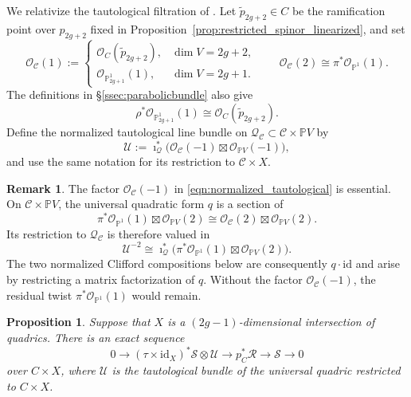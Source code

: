 \documentclass[12pt, letterpaper]{amsart}
\newtheorem{proposition}[theorem]{Proposition}
\theoremstyle{definition}
\newtheorem{remark}[theorem]{Remark}
\newcommand{\PP}{\mathbb{P} }
\newcommand{\cC}{\mathcal{C} }
\newcommand{\cO}{\mathcal{O} }
\newcommand{\cQ}{\mathcal{Q} }
\newcommand{\cR}{\mathcal{R} }
\newcommand{\cS}{\mathcal{S} }
\newcommand{\cU}{\mathcal{U} }
\begin{document}
We relativize the tautological filtration of \cite[Lemma~6.1]{Kuz08b}. Let \(\widetilde p_{2g+2}\in C\) be the ramification point over \(p_{2g+2}\) fixed in Proposition~\ref{prop:restricted_spinor_linearized}, and set
\begin{equation}\label{eqn:half_pencil_bundle}
\cO_{\cC}(1):=\begin{cases} \cO_C(\widetilde p_{2g+2}),&\dim V=2g+2,\\ \cO_{\PP_{2g+1}^1}(1),&\dim V=2g+1. \end{cases}\qquad\cO_{\cC}(2)\cong\pi^*\cO_{\PP^1}(1).
\end{equation}
The definitions in \S\ref{ssec:parabolicbundle} also give
\begin{equation}\label{eqn:half_pencil_pullback}
\rho^*\cO_{\PP_{2g+1}^1}(1)\cong\cO_C(\widetilde p_{2g+2}).
\end{equation}
Define the normalized tautological line bundle on \(\cQ_{\cC}\subset\cC\times\PP V\) by
\begin{equation}\label{eqn:normalized_tautological}
\cU:=\imath_{\cQ}^*\bigl(\cO_{\cC}(-1)\boxtimes\cO_{\PP V}(-1)\bigr),
\end{equation}
and use the same notation for its restriction to \(\cC\times X\).

\begin{remark}
The factor \(\cO_{\cC}(-1)\) in \eqref{eqn:normalized_tautological} is essential. On \(\cC\times\PP V\), the universal quadratic form \(q\) is a section of
\[\pi^*\cO_{\PP^1}(1)\boxtimes\cO_{\PP V}(2)\cong \cO_{\cC}(2)\boxtimes\cO_{\PP V}(2).\]
Its restriction to \(\cQ_{\cC}\) is therefore valued in
\[\cU^{-2}\cong \imath_{\cQ}^*\bigl(\pi^*\cO_{\PP^1}(1)\boxtimes\cO_{\PP V}(2)\bigr).\]
The two normalized Clifford compositions below are consequently \(q\cdot\mathrm{id}\) and arise by restricting a matrix factorization of \(q\). Without the factor \(\cO_{\cC}(-1)\), the residual twist \(\pi^*\cO_{\PP^1}(1)\) would remain.
\end{remark}

\begin{proposition}\label{prop:filtrationeven}
Suppose that \(X\) is a \((2g-1)\)-dimensional intersection of quadrics. There is an exact sequence
\begin{equation}\label{eqn:Raynaudfiltrationeven}
0 \to (\tau \times \mathrm{id}_X)^*\cS \otimes \cU \to p_C^*\cR \to \cS \to 0
\end{equation}
over \(C \times X\), where \(\cU\) is the tautological bundle of the universal quadric restricted to \(C \times X\).
\end{proposition}
\end{document}
